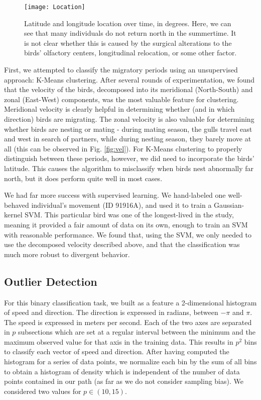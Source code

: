\documentclass[letterpaper, 10pt, conference]{ieeeconf}  %
\begin{document}
	\begin{figure}[h!]
	\centering
	\texttt{[image: Location]}
	\caption{Latitude and longitude location over time, in degrees. Here, we can see that many individuals do not return north in the summertime. It is not clear whether this is caused by the surgical alterations to the birds' olfactory centers, longitudinal relocation, or some other factor.}
    \label{fig:loc}
	\end{figure}
    
    First, we attempted to classify the migratory periods using an unsupervised approach: K-Means clustering. After several rounds of experimentation, we found that the velocity of the birds, decomposed into its meridional (North-South) and zonal (East-West) components, was the most valuable feature for clustering. Meridional velocity is clearly helpful in determining whether (and in which direction) birds are migrating. The zonal velocity is also valuable for determining whether birds are nesting or mating - during mating season, the gulls travel east and west in search of partners, while during nesting season, they barely move at all (this can be observed in Fig. \ref{fig:vel}). For K-Means clustering to properly distinguish between these periods, however, we did need to incorporate the birds' latitude. This causes the algorithm to misclassify when birds nest abnormally far north, but it does perform quite well in most cases.
    
    We had far more success with supervised learning. We hand-labeled one well-behaved individual's movement (ID 91916A), and used it to train a Gaussian-kernel SVM. This particular bird was one of the longest-lived in the study, meaning it provided a fair amount of data on its own, enough to train an SVM with reasonable performance. We found that, using the SVM, we only needed to use the decomposed velocity described above, and that the classification was much more robust to divergent behavior.
    
\subsection{Outlier Detection}
	For this binary classification task, we built as a feature a 2-dimensional histogram of speed and direction. The direction is expressed in radians, between $-\pi$ and $\pi$. The speed is expressed in meters per second. Each of the two axes are separated in $p$ subsections which are set at a regular interval between the minimum and the maximum observed value for that axis in the training data. This results in $p^2$ bins to classify each vector of speed and direction. After having computed the histogram for a series of data points, we normalize each bin by the sum of all bins to obtain a histogram of density which is independent of the number of data points contained in our path (as far as we do not consider sampling bias). We considered two values for $p \in (10,15)$.
\end{document}
